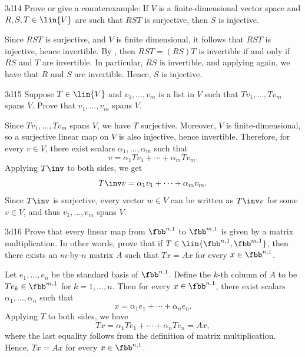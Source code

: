 \begin{exercise}{3d14}
    Prove or give a counterexample: If $V$ is a finite-dimensional vector space and $R, S, T \in \lin{V}$ are such that $RST$ is surjective, then $S$ is injective.
\end{exercise}

\begin{sol}
    Since $RST$ is surjective, and $V$ is finite dimensional, it follows that $RST$ is injective, hence invertible.
	By , then $RST = (RS)T$ is invertible if and only if $RS$ and $T$ are invertible.
	In particular, $RS$ is invertible, and applying  again, we have that $R$ and $S$ are invertible.
	Hence, $S$ is injective.
\end{sol}

\begin{exercise}{3d15}
    Suppose $T \in \lin{V}$ and $v_1, \ldots, v_m$ is a list in $V$ such that $Tv_1, \ldots, Tv_m$ spans $V$.
	Prove that $v_1, \ldots, v_m$ spans $V$.
\end{exercise}

\begin{sol}
    Since $Tv_1, \ldots, Tv_m$ spans $V$, we have $T$ surjective.
	Moreover, $V$ is finite-dimensional, so a surjective linear map on $V$ is also injective, hence invertible.
	Therefore, for every $v \in V$, there exist scalars $\alpha_1, \ldots, \alpha_m$ such that
    \[
    	v = \alpha_1 Tv_1 + \cdots + \alpha_m Tv_m.
    \]
    Applying $T\inv$ to both sides, we get
    \[
    	T\inv v = \alpha_1 v_1 + \cdots + \alpha_m v_m.
    \]
    Since $T\inv$ is surjective, every vector $w \in V$ can be written as $T\inv v$ for some $v \in V$, and thus $v_1, \ldots, v_m$ spans $V$.
\end{sol}

\begin{exercise}{3d16}
    Prove that every linear map from $\fbb^{n, 1}$ to $\fbb^{m, 1}$ is given by a matrix multiplication.
	In other words, prove that if $T \in \lin{\fbb^{n, 1}, \fbb^{m, 1}}$, then there exists an $m$-by-$n$ matrix $A$ such that $Tx = Ax$ for every $x \in \fbb^{n, 1}$.
\end{exercise}

\begin{sol}
    Let $e_1, \ldots, e_n$ be the standard basis of $\fbb^{n, 1}$.
	Define the $k$-th column of $A$ to be $Te_k \in \fbb^{m, 1}$ for $k = 1, \ldots, n$.
	Then for every $x \in \fbb^{n, 1}$, there exist scalars $\alpha_1, \ldots, \alpha_n$ such that
    \[
    	x = \alpha_1 e_1 + \cdots + \alpha_n e_n.
    \]
    Applying $T$ to both sides, we have
    \[
    	Tx = \alpha_1 Te_1 + \cdots + \alpha_n Te_n = A x,
    \]
    where the last equality follows from the definition of matrix multiplication.
	Hence, $Tx = Ax$ for every $x \in \fbb^{n, 1}$.
\end{sol}

